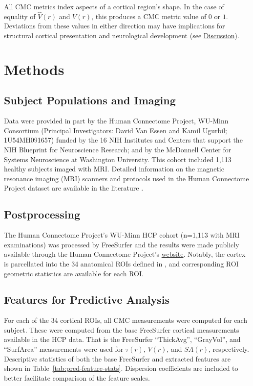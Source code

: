 \documentclass{article}
\newcommand{\CMC}{\(\text{CMC}\) }
\begin{document}
All CMC metrics index aspects of a cortical region's shape. In the case of
equality of \(\hat{V}(r)\) and \(V(r)\), this produces a \CMC metric value of
\(0\) or \(1\). Deviations from these values in either direction may have
implications for structural cortical presentation and neurological
development (see \hyperref[sec:discussion]{Discussion}).

\section{Methods}
\label{sec:methods}
\subsection{Subject Populations and Imaging}
\label{sec:population}

Data were provided in part by the Human Connectome Project, WU-Minn
Consortium (Principal Investigators: David Van Essen and Kamil Ugurbil;
1U54MH091657) funded by the 16 NIH Institutes and Centers that support the
NIH Blueprint for Neuroscience Research; and by the McDonnell Center for
Systems Neuroscience at Washington University. This cohort included 1,113
healthy subjects imaged with MRI\@. Detailed information on the magnetic
resonance imaging (MRI) scanners and protocols used in the Human Connectome
Project dataset are available in the literature
\citep{elamHumanConnectomeProject2021}.

\subsection{Postprocessing}
\label{sec:postprocessing}

The Human Connectome Project's WU-Minn HCP cohort (n=1,113 with MRI
examinations) was processed by FreeSurfer \citep{fischlFreeSurfer2012} and
the results were made publicly available through the Human Connectome
Project's \href{%
https://www.humanconnectome.org/study/hcp-young-adult/document/1200-subjects-data-release}{website}.
Notably, the cortex is parcellated into the 34 anatomical ROIs defined in
\citet{desikanAutomatedLabelingSystem2006}, and corresponding ROI geometric
statistics are available for each ROI.

\subsection{Features for Predictive Analysis}

For each of the 34 cortical ROIs, all CMC measurements were computed for
each subject. These were computed from the base FreeSurfer cortical measurements
available in the HCP data. That is the FreeSurfer ``ThickAvg'', ``GrayVol'', and
``SurfArea'' measurements were used for \(\tau(r)\),  \(V(r)\), and \(SA(r)\),
respectively. Descriptive statistics of both the base FreeSurfer and extracted features
are shown in Table~\ref{tab:pred-feature-stats}. Dispersion coefficients are included to
better facilitate comparison of the feature scales.
\end{document}
